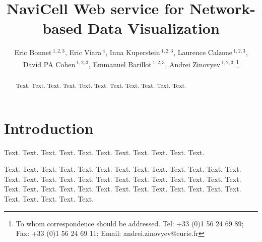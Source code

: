 \documentclass[a4,center,fleqn]{NAR}
\begin{document}
\title{NaviCell Web service for Network-based Data Visualization}


\author{%
Eric Bonnet\,$^{1,2,3}$,
Eric Viara\,$^{4}$,
Inna Kuperstein\,$^{1,2,3}$,
Laurence Calzone\,$^{1,2,3}$,
David PA Cohen\,$^{1,2,3}$,
Emmanuel Barillot\,$^{1,2,3}$,
Andrei Zinovyev\,$^{1,2,3}$%
\footnote{To whom correspondence should be addressed.
Tel: +33 (0)1 56 24 69 89; Fax: +33 (0)1 56 24 69 11; Email: andrei.zinovyev@curie.fr}}



\address{%
$^{1}$Institut Curie, 26 rue d'Ulm, 75248 Paris, France, 
$^{2}$INSERM U900, 75248 Paris, France,
$^{3}$Mines ParisTech, 77300 Fontainebleau, France,
$^{4}$Sysra, 91330 Yerres, France.
}




\maketitle

\begin{abstract}
Text. Text. Text. Text. Text. Text. Text. Text. Text. Text. Text.
\end{abstract}


\section{Introduction}

Text. Text. Text. Text. Text. Text. Text. Text. Text. Text. Text.


Text. Text. Text. Text. Text. Text. Text. Text. Text. Text. Text.
Text. Text. Text. Text. Text. Text. Text. Text. Text. Text. Text.
Text. Text. Text. Text. Text. Text. Text. Text. Text. Text. Text.
Text. Text. Text. Text. Text. Text. Text. Text. Text. Text. Text.
\end{document}
